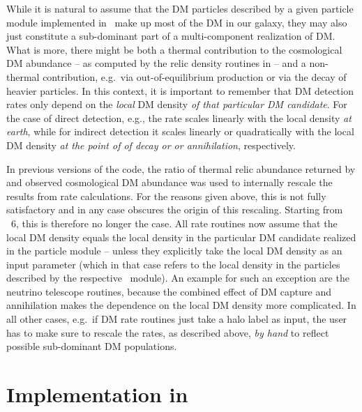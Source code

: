 While it is natural to assume that the DM particles described by a given
particle module implemented in \ds\ make up most of the DM 
in our galaxy, they may also just constitute a sub-dominant part
of a multi-component realization of DM. What is more, there might 
be both a thermal contribution to the cosmological DM abundance
-- as computed by the relic density routines in \ds -- and a non-thermal
contribution, e.g.~via out-of-equilibrium production or via the decay
of heavier particles.
%
In this context, it is important to remember that DM detection rates
only depend on the {\it local} DM density {\it of that particular DM candidate}. 
For the case of direct detection, e.g.,
the rate scales linearly with the local density {\it at earth}, while
for indirect detection it scales linearly or quadratically with the
local DM density {\it at the point of of decay or or annihilation}, respectively.

In previous versions of the code, the ratio of thermal relic abundance returned
by  and observed cosmological DM abundance
was used to internally rescale the results from rate calculations. For the reasons
given above, this is not fully satisfactory and in any case obscures the origin
of this rescaling. Starting from \ds\ 6, this is therefore no longer the case. 
All rate routines now assume that the local DM density equals the local density
in the particular DM candidate realized in the particle module -- 
unless they explicitly take the local DM density as an input parameter 
(which in that case refers to the local density in the particles described by the
respective \ds\ module). An example for such an exception are the 
neutrino telescope routines, because the combined effect of DM capture and
annihilation makes the dependence on the local DM density more complicated.
In all other cases, e.g.~if DM rate routines just take a halo label as input,
the user has to make sure to rescale the rates, as described above, {\it by hand}
to reflect possible sub-dominant DM populations.




\section{Implementation in \ds}


